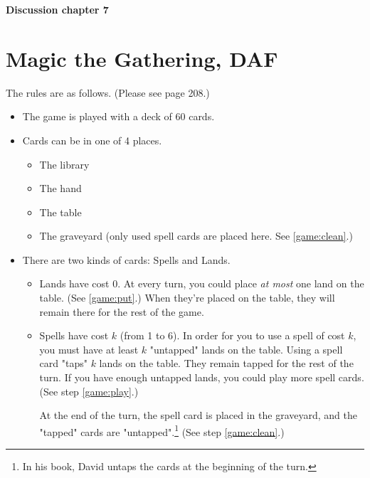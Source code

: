 \documentclass[10pt, leqno]{exam}
\newcommand{\assignment}{Discussion chapter 7}
\begin{document}
    \textbf{{\LARGE \assignment}}

    \section*{Magic the Gathering, DAF}

    The rules are as follows. (Please see page 208.)
    \begin{itemize}
    \item The game is played with a deck of 60 cards.
    \item Cards can be in one of 4 places.
        \begin{itemize}
        \item The library
        \item The hand
        \item The table
        \item The graveyard (only used spell cards are placed here.
        See \ref{game:clean}.)
        \end{itemize}

    \item There are two kinds of cards: Spells and Lands.
        \begin{itemize}
        \item Lands have cost 0. At every turn, you could place \textit{at most}
        one land on the table. (See \ref{game:put}.) When they're placed on the table, they will
        remain there for the rest of the game.
        \item Spells have cost $k$ (from 1 to 6). In order for you to use
        a spell of cost $k$, you must have at least $k$ "untapped" lands on
        the table. Using a spell card "taps" $k$ lands on the table. They
        remain tapped for the rest of the turn. If you have enough untapped
        lands, you could play more spell cards. (See step \ref{game:play}.)

        At the end of the turn, the spell card is placed in the graveyard,
        and the "tapped" cards are "untapped".\footnote{In his book, David
        untaps the cards at the beginning of the turn.} (See step \ref{game:clean}.)
        \end{itemize}
    \end{itemize}
\end{document}
